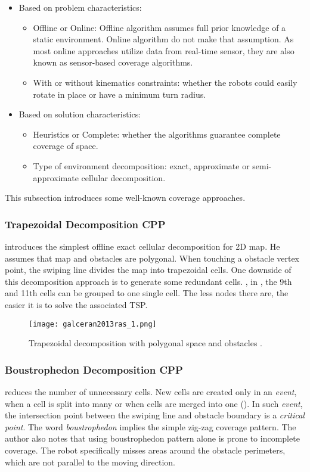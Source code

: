 \begin{itemize}
	\item Based on problem characteristics:
	\begin{itemize}
		\item Offline or Online: Offline algorithm assumes full prior knowledge of a static environment. Online algorithm do not make that assumption. As most online approaches utilize data from real-time sensor, they are also known as sensor-based coverage algorithms.
		\item With or without kinematics constraints: whether the robots could easily rotate in place or have a minimum turn radius.
	\end{itemize}
	\item Based on solution characteristics:
	\begin{itemize}
		\item Heuristics or Complete: whether the algorithms guarantee complete coverage of space.
		\item Type of environment decomposition: exact, approximate or semi-approximate cellular decomposition.
	\end{itemize}	
\end{itemize}

This subsection introduces some well-known coverage approaches.

\subsubsection{Trapezoidal Decomposition \ac{CPP}}
 introduces the simplest offline exact cellular decomposition for 2D map. He assumes that map and obstacles are polygonal. When touching a obstacle vertex point, the swiping line divides the map into trapezoidal cells. One downside of this decomposition approach is to generate some redundant cells. \Eg, in , the 9th and 11th cells can be grouped to one single cell. The less nodes there are, the easier it is to solve the associated \ac{TSP}.

\begin{figure}[!htb]
	\centering
	\texttt{[image: galceran2013ras\_1.png]}
	\caption{Trapezoidal decomposition with polygonal space and obstacles \cite{galceran2013ras}.}
	\label{fig:galceran2013ras_1}
\end{figure}

\subsubsection{Boustrophedon Decomposition \ac{CPP}}
 reduces the number of unnecessary cells. New cells are created only in an \textit{event}, when a cell is split into many or when cells are merged into one (). In such \textit{event}, the intersection point between the swiping line and obstacle boundary is a \textit{critical point}. The word \textit{boustrophedon} implies the simple zig-zag coverage pattern. The author also notes that using boustrophedon pattern alone is prone to incomplete coverage. The robot specifically misses areas around the obstacle perimeters, which are not parallel to the moving direction.

